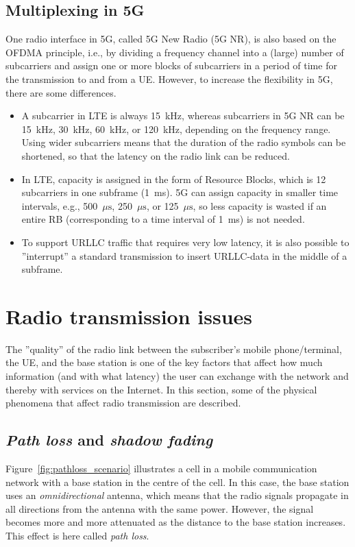 \subsection{Multiplexing in 5G}
One radio interface in 5G, called 5G New Radio (5G NR), is also based on the OFDMA principle, i.e., by dividing a frequency channel into a (large) number of subcarriers and assign one or more blocks of subcarriers in a period of time for the transmission to and from a UE. However, to increase the flexibility in 5G, there are some differences.
\begin{itemize}
%
\item A subcarrier in LTE is always 15~kHz, whereas subcarriers in 5G NR can be  15~kHz, 30~kHz, 60~kHz, or 120~kHz, depending on the frequency range. Using wider subcarriers means that the duration of the radio symbols can be shortened, so that the latency on the radio link can be reduced.
%
\item In LTE, capacity is assigned in the form of Resource Blocks, which is 12 subcarriers in one subframe (1~ms). 5G can assign capacity in smaller time intervals, e.g., 500~$\mu{}\textrm{s}$, 250~$\mu{}\textrm{s}$, or 125~$\mu{}\textrm{s}$, so less capacity is wasted if an entire RB (corresponding to a time interval of 1~ms) is not needed.
%
\item To support URLLC traffic that requires very low latency, it is also possible to ''interrupt'' a standard transmission to insert URLLC-data in the middle of a subframe.
%
\end{itemize}


\section{Radio transmission issues}\label{chap:radio}
The ''quality'' of the radio link between the subscriber's mobile phone/terminal, the UE, and the base station is one of the key factors that affect how much information (and with what latency) the user can exchange with the network and thereby with services on the Internet. In this section, some of the physical phenomena that affect radio transmission are described.

\subsection{\emph{Path loss} and \emph{shadow fading}}\label{sec:pathloss}
Figure~\ref{fig:pathloss_scenario} illustrates a cell in a mobile communication network with a base station in the centre of the cell. In this case, the base station uses an \emph{omnidirectional} antenna, which means that the radio signals propagate in all directions from the antenna with the same power. However, the signal becomes more and more attenuated as the distance to the base station increases. This effect is here called \emph{path loss}.

